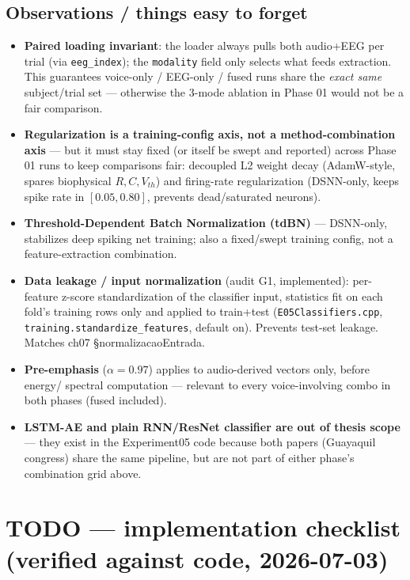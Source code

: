 \subsection*{Observations / things easy to forget}

\begin{itemize}
    \item \textbf{Paired loading invariant}: the loader always pulls both audio+EEG per trial
    (via \texttt{eeg\_index}); the \texttt{modality} field only selects what feeds extraction. This
    guarantees voice-only / EEG-only / fused runs share the \emph{exact same} subject/trial set ---
    otherwise the 3-mode ablation in Phase 01 would not be a fair comparison.
    \item \textbf{Regularization is a training-config axis, not a method-combination axis} --- but it
    must stay fixed (or itself be swept and reported) across Phase 01 runs to keep comparisons fair:
    decoupled L2 weight decay (AdamW-style, spares biophysical $R,C,V_{th}$) and firing-rate
    regularization (DSNN-only, keeps spike rate in $[0.05, 0.80]$, prevents dead/saturated neurons).
    \item \textbf{Threshold-Dependent Batch Normalization (tdBN)} --- DSNN-only, stabilizes deep
    spiking net training; also a fixed/swept training config, not a feature-extraction combination.
    \item \textbf{Data leakage / input normalization} (audit G1, implemented): per-feature z-score
    standardization of the classifier input, statistics fit on each fold's training rows only and
    applied to train+test (\texttt{E05Classifiers.cpp}, \texttt{training.standardize\_features},
    default on). Prevents test-set leakage. Matches ch07 \S normalizacaoEntrada.
    \item \textbf{Pre-emphasis} ($\alpha=0.97$) applies to audio-derived vectors only, before energy/
    spectral computation --- relevant to every voice-involving combo in both phases (fused included).
    \item \textbf{LSTM-AE and plain RNN/ResNet classifier are out of thesis scope} --- they exist in
    the Experiment05 code because both papers (Guayaquil congress) share the same pipeline, but are
    not part of either phase's combination grid above.
\end{itemize}

\section*{TODO --- implementation checklist (verified against code, 2026-07-03)}

